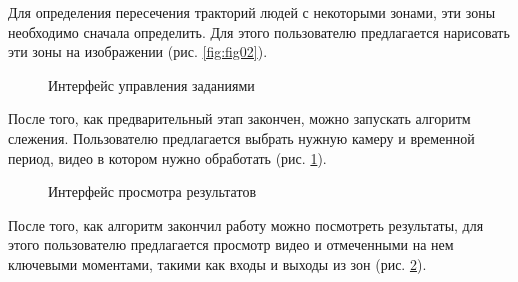 Для определения пересечения тракторий людей с некоторыми зонами, эти зоны необходимо сначала определить. Для этого пользователю предлагается нарисовать эти зоны на изображении (рис. \ref{fig:fig02}).

\begin{figure}[h]
  \centering
  \caption{Интерфейс управления заданиями}
  \label{fig:fig03}
\end{figure}

После того, как предварительный этап закончен, можно запускать алгоритм слежения. Пользователю предлагается выбрать нужную камеру и временной период, видео в котором нужно обработать (рис. \ref{fig:fig03}).

\begin{figure}[h]
  \centering
  \caption{Интерфейс просмотра результатов}
  \label{fig:fig04}
\end{figure}

После того, как алгоритм закончил работу можно посмотреть результаты, для этого пользователю предлагается просмотр видео и отмеченными на нем ключевыми моментами, такими как входы и выходы из зон (рис. \ref{fig:fig04}).



